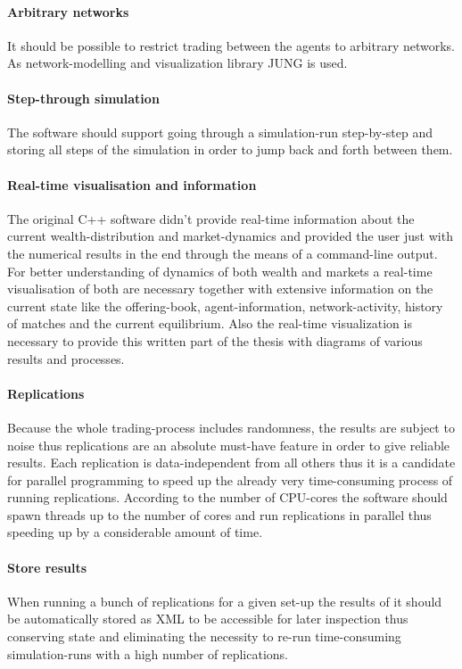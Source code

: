 \documentclass[Bachelorarbeit.tex]{subfiles}
\begin{document}
\paragraph{Arbitrary networks}
It should be possible to restrict trading between the agents to arbitrary networks. As network-modelling and visualization library JUNG is used.

\paragraph{Step-through simulation}
The software should support going through a simulation-run step-by-step and storing all steps of the simulation in order to jump back and forth between them.

\paragraph{Real-time visualisation and information}
The original C++ software didn't provide real-time information about the current wealth-distribution and market-dynamics and provided the user just with the numerical results in the end through the means of a command-line output. For better understanding of dynamics of both wealth and markets a real-time visualisation of both are necessary together with extensive information on the current state like the offering-book, agent-information, network-activity, history of matches and the current equilibrium. Also the real-time visualization is necessary to provide this written part of the thesis with diagrams of various results and processes.

\paragraph{Replications}
Because the whole trading-process includes randomness, the results are subject to noise thus replications are an absolute must-have feature in order to give reliable results. Each replication is data-independent from all others thus it is a candidate for parallel programming to speed up the already very time-consuming process of running replications. According to the number of CPU-cores the software should spawn threads up to the number of cores and run replications in parallel thus speeding up by a considerable amount of time.

\paragraph{Store results}
When running a bunch of replications for a given set-up the results of it should be automatically stored as XML to be accessible for later inspection thus conserving state and eliminating the necessity to re-run time-consuming simulation-runs with a high number of replications.
\end{document}
